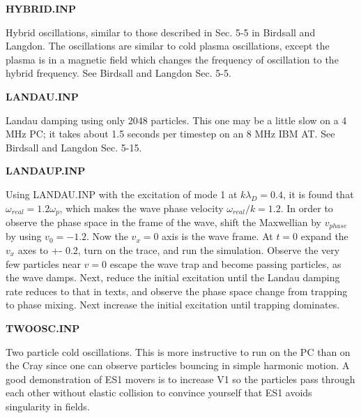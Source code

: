 \begin{section}
\begin{subsection}
\begin{subsubsection}
{\bf HYBRID.INP}

      Hybrid oscillations, similar to those described in Sec. 5-5 in Birdsall
      and Langdon.  The oscillations are similar to cold plasma oscillations,
      except the plasma is in a magnetic field which changes the frequency of
      oscillation to the hybrid frequency.  See Birdsall and Langdon Sec. 5-5.
\end{subsubsection}

\begin{subsubsection}
{\bf LANDAU.INP}

      Landau damping using only 2048 particles.  This one may be a little slow
      on a 4 MHz PC; it takes about 1.5 seconds per timestep on an 8 MHz IBM
      AT.  See Birdsall and Langdon Sec. 5-15.
\end{subsubsection}

\begin{subsubsection}
{\bf LANDAUP.INP}

  Using LANDAU.INP with the excitation of mode 1 at $k \lambda_D = 0.4$,
it is found that $\omega_{real} = 1.2 \omega_p$, which makes the wave 
phase velocity $\omega_{real}/k = 1.2$.  In order to observe the phase 
space in the frame of the wave, shift the Maxwellian by $v_{phase}$ by
using $v_0 = -1.2.$  Now the $v_x=0$ axis is the wave frame.  At $t=0$
expand the $v_x$ axes to +- 0.2, turn on the trace, and run the simulation.
Observe the very few particles near $v=0$ escape the wave trap and become
passing particles, as the wave damps.  Next, reduce the initial excitation
until the Landau damping rate reduces to that in texts, and observe the
phase space change from trapping to phase mixing.  Next increase the initial
excitation until trapping dominates.

\end{subsubsection}

\begin{subsubsection}
{\bf TWOOSC.INP}

      Two particle cold oscillations.  This is more instructive to run on the
      PC than on the Cray since one can observe particles bouncing in simple
      harmonic motion.  A good demonstration of ES1 movers is to increase V1 so
      the particles pass through each other without elastic collision to
      convince yourself that ES1 avoids singularity in fields.
\end{subsubsection}
\end{subsection}


\end{section}
